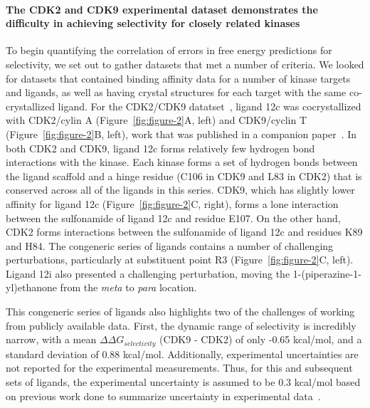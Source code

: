 \documentclass[9pt,lineno]{elife-modified} %
\begin{document}
\paragraph{The CDK2 and CDK9 experimental dataset demonstrates the difficulty in achieving selectivity for closely related kinases}
To begin quantifying the correlation of errors in free energy predictions for selectivity, we set out to gather datasets that met a number of criteria. We looked for datasets that contained binding affinity data for a number of kinase targets and ligands, as well as having crystal structures for each target with the same co-crystallized ligand. For the CDK2/CDK9 datatset~\citep{Shao2013-oe}, ligand 12c was cocrystallized with CDK2/cylin A (Figure~\ref{fig:figure-2}A, left) and CDK9/cyclin T (Figure~\ref{fig:figure-2}B, left), work that was published in a companion paper~\citep{Hole2013-sr}. In both CDK2 and CDK9, ligand 12c forms relatively few hydrogen bond interactions with the kinase. Each kinase forms a set of hydrogen bonds between the ligand scaffold and a hinge residue (C106 in CDK9 and L83 in CDK2) that is conserved across all of the ligands in this series. CDK9, which has slightly lower affinity for ligand 12c (Figure~\ref{fig:figure-2}C, right), forms a lone interaction between the sulfonamide of ligand 12c and residue E107. On the other hand, CDK2 forms interactions between the sulfonamide of ligand 12c and residues K89 and H84. The congeneric series of ligands contains a number of challenging perturbations, particularly at substituent point R3 (Figure~\ref{fig:figure-2}C, left). Ligand 12i also presented a challenging perturbation, moving the 1-(piperazine-1-yl)ethanone from the \emph{meta} to \emph{para} location. 

This congeneric series of ligands also highlights two of the challenges of working from publicly available data. First, the dynamic range of selectivity is incredibly narrow, with a mean $\Delta \Delta G_{selectivity}$ (CDK9 - CDK2) of only -0.65 kcal/mol, and a standard deviation of 0.88 kcal/mol. Additionally, experimental uncertainties are not reported for the experimental measurements. Thus, for this and subsequent sets of ligands, the experimental uncertainty is assumed to be 0.3 kcal/mol based on previous work done to summarize uncertainty in experimental data~\citep{BROWN2009420,Hauser:2018vz}. 
\end{document}
